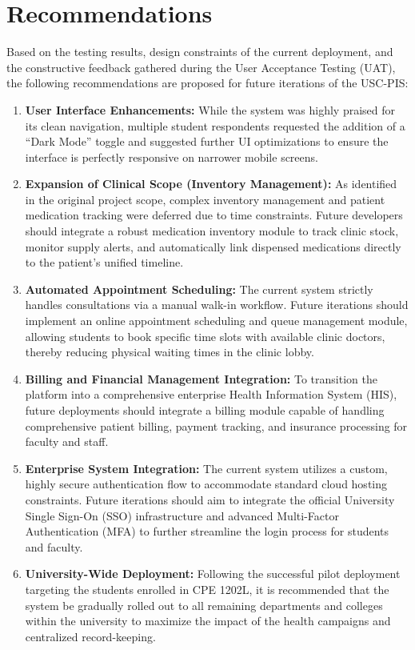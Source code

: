 \section{Recommendations}
Based on the testing results, design constraints of the current deployment, and the constructive feedback gathered during the User Acceptance Testing (UAT), the following recommendations are proposed for future iterations of the USC-PIS:

\begin{enumerate}
    \item \textbf{User Interface Enhancements:} While the system was highly praised for its clean navigation, multiple student respondents requested the addition of a ``Dark Mode'' toggle and suggested further UI optimizations to ensure the interface is perfectly responsive on narrower mobile screens.
    \item \textbf{Expansion of Clinical Scope (Inventory Management):} As identified in the original project scope, complex inventory management and patient medication tracking were deferred due to time constraints. Future developers should integrate a robust medication inventory module to track clinic stock, monitor supply alerts, and automatically link dispensed medications directly to the patient's unified timeline.
    \item \textbf{Automated Appointment Scheduling:} The current system strictly handles consultations via a manual walk-in workflow. Future iterations should implement an online appointment scheduling and queue management module, allowing students to book specific time slots with available clinic doctors, thereby reducing physical waiting times in the clinic lobby.
    \item \textbf{Billing and Financial Management Integration:} To transition the platform into a comprehensive enterprise Health Information System (HIS), future deployments should integrate a billing module capable of handling comprehensive patient billing, payment tracking, and insurance processing for faculty and staff.
    \item \textbf{Enterprise System Integration:} The current system utilizes a custom, highly secure authentication flow to accommodate standard cloud hosting constraints. Future iterations should aim to integrate the official University Single Sign-On (SSO) infrastructure and advanced Multi-Factor Authentication (MFA) to further streamline the login process for students and faculty.
    \item \textbf{University-Wide Deployment:} Following the successful pilot deployment targeting the students enrolled in CPE 1202L, it is recommended that the system be gradually rolled out to all remaining departments and colleges within the university to maximize the impact of the health campaigns and centralized record-keeping.

\end{enumerate}
